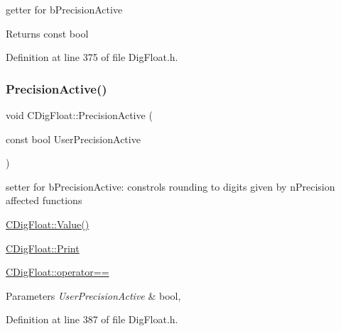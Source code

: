 getter for b\+Precision\+Active 

\begin{DoxyReturn}{Returns}
const bool 
\end{DoxyReturn}


Definition at line 375 of file Dig\+Float.\+h.

\mbox{\label{classCDigFloat_a680354bead4079c14a67688124bb4b85}} 
\subsubsection{\texorpdfstring{Precision\+Active()}{PrecisionActive()}\hspace{0.1cm}{\footnotesize\ttfamily [2/2]}}
{\footnotesize\ttfamily void C\+Dig\+Float\+::\+Precision\+Active (\begin{DoxyParamCaption}\item[{const bool}]{User\+Precision\+Active }\end{DoxyParamCaption})\hspace{0.3cm}{\ttfamily [inline]}}



setter for b\+Precision\+Active\+: constrols rounding to digits given by n\+Precision affected functions 


\begin{DoxyItemize}
\item \hyperlink{classCDigFloat_af74b8cd0935294b6371f551b7a1ff640}{C\+Dig\+Float\+::\+Value()}
\item \hyperlink{classCDigFloat_a80731e0970f607114d6d1bde4d02bd39}{C\+Dig\+Float\+::\+Print}
\item \hyperlink{classCDigFloat_ad8980d984bf2bab71d15b830fd0180a5}{C\+Dig\+Float\+::operator==}
\end{DoxyItemize}


\begin{DoxyParams}{Parameters}
{\em User\+Precision\+Active} & bool, \\
\hline
\end{DoxyParams}


Definition at line 387 of file Dig\+Float.\+h.

\mbox{\label{classCDigFloat_ad39db10046bbfd27c2537581bdb7e073}} 
